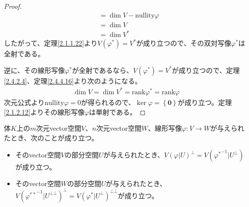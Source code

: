 \documentclass[dvipdfmx]{jsarticle}
\begin{document}
\begin{proof}
\begin{align*}
&= \dim V - \mathrm{nullity} \varphi \\
&= \dim V\\
&= \dim V^{*}
\end{align*}
したがって、定理\ref{2.1.1.22}より$V\left( \varphi^{*} \right) = V^{*}$が成り立つので、その双対写像$\varphi^{*}$は全射である。\par
逆に、その線形写像$\varphi^{*}$が全射であるなら、$V\left( \varphi^{*} \right) = V^{*}$が成り立つので、定理\ref{2.4.2.4}、定理\ref{2.4.4.16}より次のようになる。
\begin{align*}
\dim V = \dim V^{*} = \mathrm{rank} \varphi^{*} = \mathrm{rank} \varphi 
\end{align*}
次元公式より$\mathrm{nullity} \varphi = 0$が得られるので、$\ker\varphi = \left\{ \mathbf{0} \right\}$が成り立つ。定理\ref{2.1.2.12}よりその線形写像$\varphi$は単射である。
\end{proof}
\begin{thm}\label{2.4.4.18}
体$K$上の$m$次元vector空間$V$、$n$次元vector空間$W$、線形写像$\varphi:V \rightarrow W$が与えられたとき、次のことが成り立つ。
\begin{itemize}
\item
  そのvector空間$V$の部分空間$U$が与えられたとき、${V\left( \varphi|U \right)}^{\bot} = V\left( {\varphi^{*}}^{- 1}|U^{\bot} \right)$が成り立つ。
\item
  そのvector空間$W$の部分空間$U$が与えられたとき、${V\left( {\varphi^{**}}^{- 1}|U^{\bot\bot} \right)}^{\bot} = V\left( \varphi^{*}|U^{\bot} \right)^{\bot\bot}$が成り立つ。
\end{itemize}
\end{thm}
\end{document}
